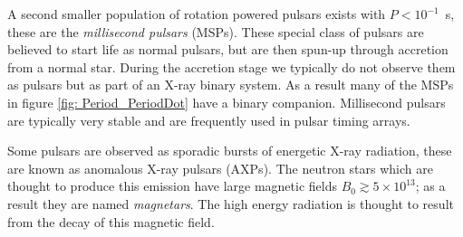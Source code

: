 A second smaller population of rotation powered pulsars exists with
$P<10^{-1}$~s, these are the \emph{millisecond pulsars} (MSPs). These special
class of pulsars are believed to start life as normal pulsars, but are then
spun-up through accretion from a normal star. During the accretion stage we
typically do not observe them as pulsars but as part of an X-ray binary system.
As a result many of the MSPs in figure \ref{fig: Period_PeriodDot} have a
binary companion.  Millisecond pulsars are typically very stable and are
frequently used in pulsar timing arrays.

Some pulsars are observed as sporadic bursts of energetic X-ray radiation,
these are known as anomalous X-ray pulsars (AXPs).  The neutron stars which are
thought to produce this emission have large magnetic fields $B_{0}\gtrsim
5\times10^{13}$; as a result they are named \emph{magnetars}. The high energy
radiation is thought to result from the decay of this magnetic field.


